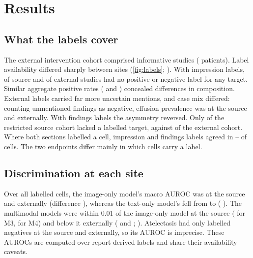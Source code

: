\section*{Results}

\subsection*{What the labels cover}
The external intervention cohort comprised \ExtNOne{} informative studies
(\ExtNOnePatients{} patients). Label availability differed sharply between
sites (\cref{fig:labels}; ). With impression labels,
\NoLabSrcImpression{} of source and \NoLabExtImpression{} of external studies
had no positive or negative label for any target. Similar aggregate positive
rates (\PosSrcImpression{} and \PosExtImpression{}) concealed differences in
composition. External labels carried far more uncertain mentions, and case mix
differed: counting unmentioned findings as negative, effusion prevalence was
\SrcEffUnmNeg{} at the source and \ExtEffUnmNeg{} externally. With findings
labels the asymmetry reversed. Only \NoLabSrcFindings{} of the restricted
source cohort lacked a labelled target, against \NoLabExtFindings{} of the
external cohort. Where both sections labelled a cell, impression and findings
labels agreed in \AgreeMinSrc{}--\AgreeMaxExt{} of cells. The two endpoints
differ mainly in which cells carry a label.

\subsection*{Discrimination at each site}
Over all labelled cells, the image-only model's macro AUROC was \AucMOneSrc{} at
the source and \AucMOneExt{} externally (difference \AucMOneDiff{}
\AucMOneDiffCI{}), whereas the text-only model's fell from \AucMTwoSrc{} to
\AucMTwoExt{} (\AucMTwoDiff{} \AucMTwoDiffCI{}). The multimodal models were
within 0.01 of the image-only model at the source (\AucMThreeSrc{} for M3,
\AucMFourSrc{} for M4) and below it externally (\AucMThreeExt{} and
\AucMFourExt{}; ). Atelectasis had only \AtelNegSrc{}
labelled negatives at the source and \AtelNegExt{} externally, so its AUROC is
imprecise. These AUROCs are computed over report-derived labels and share their
availability caveats.


